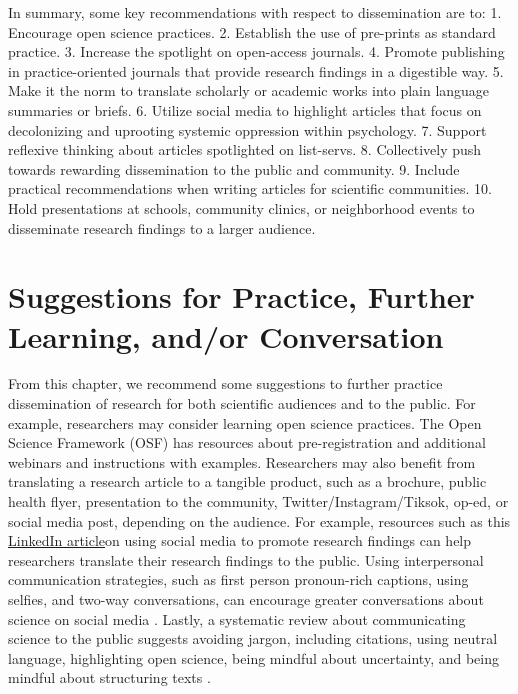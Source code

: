 \documentclass[
  11pt,
]{book}
\begin{document}
In summary, some key recommendations with respect to dissemination are to: 1. Encourage open science practices. 2. Establish the use of pre-prints as standard practice. 3. Increase the spotlight on open-access journals. 4. Promote publishing in practice-oriented journals that provide research findings in a digestible way. 5. Make it the norm to translate scholarly or academic works into plain language summaries or briefs. 6. Utilize social media to highlight articles that focus on decolonizing and uprooting systemic oppression within psychology. 7. Support reflexive thinking about articles spotlighted on list-servs. 8. Collectively push towards rewarding dissemination to the public and community. 9. Include practical recommendations when writing articles for scientific communities. 10. Hold presentations at schools, community clinics, or neighborhood events to disseminate research findings to a larger audience.

\section{Suggestions for Practice, Further Learning, and/or Conversation}\label{suggestions-for-practice-further-learning-andor-conversation-1}

From this chapter, we recommend some suggestions to further practice dissemination of research for both scientific audiences and to the public. For example, researchers may consider learning open science practices. The Open Science Framework (OSF) has resources about pre-registration and additional webinars and instructions with examples. Researchers may also benefit from translating a research article to a tangible product, such as a brochure, public health flyer, presentation to the community, Twitter/Instagram/Tiksok, op-ed, or social media post, depending on the audience. For example, resources such as this \href{https://www.linkedin.com/advice/1/how-do-you-use-social-media-promote-your-research-findings}{LinkedIn article}on using social media to promote research findings can help researchers translate their research findings to the public. Using interpersonal communication strategies, such as first person pronoun-rich captions, using selfies, and two-way conversations, can encourage greater conversations about science on social media \citep{martin_using_2020}. Lastly, a systematic review about communicating science to the public suggests avoiding jargon, including citations, using neutral language, highlighting open science, being mindful about uncertainty, and being mindful about structuring texts \citep{konig_how_2024}.
\end{document}

